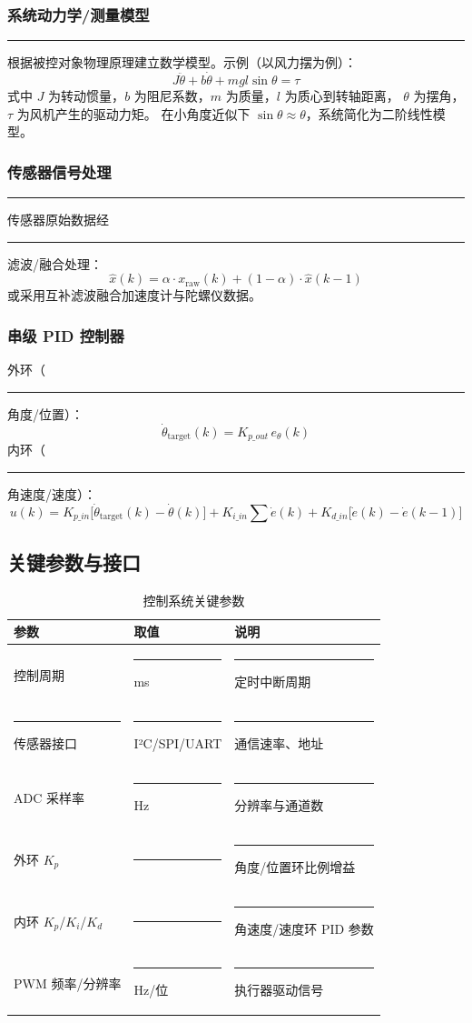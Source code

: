 \documentclass[12pt,a4paper,fontset=fandol]{ctexart}
\newcommand{\blank}{\rule{4cm}{0.4pt}}
\begin{document}
\subsubsection*{系统动力学/测量模型}
\blank{根据被控对象物理原理建立数学模型。示例（以风力摆为例）：}
\begin{equation}
  J\ddot{\theta} + b\dot{\theta} + mgl\sin\theta = \tau
  \label{eq:dynamics}
\end{equation}
式中 $J$ 为转动惯量，$b$ 为阻尼系数，$m$ 为质量，$l$ 为质心到转轴距离，
$\theta$ 为摆角，$\tau$ 为风机产生的驱动力矩。
在小角度近似下 $\sin\theta \approx \theta$，系统简化为二阶线性模型。

\subsubsection*{传感器信号处理}
\blank{传感器}原始数据经\blank{滤波/融合}处理：
\begin{equation}
  \hat{x}(k) = \alpha \cdot x_{\text{raw}}(k) + (1-\alpha) \cdot \hat{x}(k-1)
  \label{eq:filter}
\end{equation}
或采用互补滤波融合加速度计与陀螺仪数据。

\subsubsection*{串级 PID 控制器}
外环（\blank{角度/位置}）：
\begin{equation}
  \dot{\theta}_{\text{target}}(k) = K_{p\_out}\, e_{\theta}(k)
  \label{eq:outer}
\end{equation}
内环（\blank{角速度/速度}）：
\begin{equation}
  u(k) = K_{p\_in}\bigl[\dot{\theta}_{\text{target}}(k) - \dot{\theta}(k)\bigr]
        + K_{i\_in} \sum \dot{e}(k)
        + K_{d\_in}\bigl[\dot{e}(k) - \dot{e}(k-1)\bigr]
  \label{eq:inner}
\end{equation}

\subsection{关键参数与接口}
\begin{table}[H]
\centering
\caption{控制系统关键参数}
\begin{tabularx}{\textwidth}{p{3.2cm}p{3.6cm}Y}
\toprule
参数 & 取值 & 说明\\
\midrule
控制周期 & \blank{ms} & \blank{定时中断周期}\\
\blank{传感器}接口 & \blank{I²C/SPI/UART} & \blank{通信速率、地址}\\
ADC 采样率 & \blank{Hz} & \blank{分辨率与通道数}\\
外环 $K_p$ & \blank{} & \blank{角度/位置环比例增益}\\
内环 $K_p$/$K_i$/$K_d$ & \blank{} & \blank{角速度/速度环 PID 参数}\\
PWM 频率/分辨率 & \blank{Hz/位} & \blank{执行器驱动信号}\\
\bottomrule
\end{tabularx}
\end{table}
\end{document}
